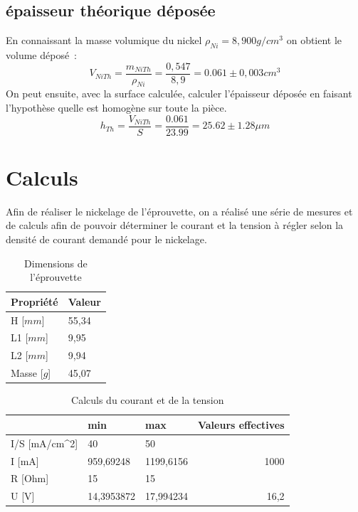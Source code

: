   \subsection{épaisseur théorique déposée}
  En connaissant la masse volumique du nickel $\rho_{Ni}=8,900 g/cm^3$ on obtient le volume déposé :
  \begin{equation}
    V_{NiTh}=\frac{m_{NiTh}}{\rho_{Ni}}=\frac{0,547}{8,9}=0.061 \pm 0,003 cm^3 
  \end{equation} 
  On peut ensuite, avec la surface calculée, calculer l'épaisseur déposée en faisant l'hypothèse quelle est homogène sur toute la pièce. 
  \begin{equation}
    h_{Th}=\frac{V_{NiTh}}{S}=\frac{0.061}{23.99}=25.62\pm 1.28 \mu m
  \end{equation} 






\section{Calculs}
Afin de réaliser le nickelage de l'éprouvette, on a réalisé une série de mesures et de calculs afin de pouvoir déterminer le courant et la tension à régler selon la densité de courant demandé pour le nickelage.

\begin{table}[H]
    \centering
    \begin{tabular}{|l|l|}
    \hline
    \rowcolor[HTML]{CBCEFB} 
    Propriété & Valeur \\ \hline
    H {[}$mm${]} & 55,34 \\ \hline
    L1 {[}$mm${]} & 9,95 \\ \hline
    L2 {[}$mm${]} & 9,94 \\ \hline
    Masse {[}$g${]} & 45,07 \\ \hline
    \end{tabular}
    \caption{Dimensions de l'éprouvette}
    \label{tab: dimeprouv}
\end{table}



\begin{table}[H]
    \centering
    \begin{tabular}{|l|l|l|r|}
    \hline
    \rowcolor[HTML]{CBCEFB} 
    \textbf{} & \textbf{min} & \textbf{max} & \multicolumn{1}{l|}{\cellcolor[HTML]{CBCEFB}\textbf{Valeurs effectives}} \\ \hline
    I/S {[}mA/cm\textasciicircum{}2{]} & 40 & 50 & \multicolumn{1}{l|}{} \\ \hline
    I {[}mA{]} & 959,69248 & 1199,6156 & \cellcolor[HTML]{FFFF00}1000 \\ \hline
    R {[}Ohm{]} & 15 & 15 & \cellcolor[HTML]{FFFFFF} \\ \hline
    U {[}V{]} & 14,3953872 & 17,994234 & \cellcolor[HTML]{FFFF00}16,2 \\ \hline
    \end{tabular}
    \caption{Calculs du courant et de la tension}
    \label{tab: calculcourant}
    \end{table}


